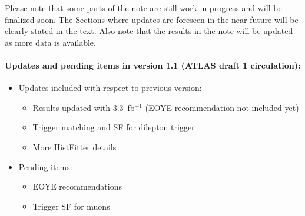 Please note that some parts of the note are still work in progress and will be finalized soon.
The Sections where updates are foreseen in the near future will be clearly stated in the text. 
Also note that the results in the note will be updated as more data is available.


\paragraph{Updates and pending items in version 1.1 (ATLAS draft 1 circulation):}
\begin{itemize}
\item Updates included with respect to previous version:
\begin{itemize}
\item Results updated with 3.3~fb$^{-1}$ (EOYE recommendation not included yet)
\item Trigger matching and SF for dilepton trigger
\item More HistFitter details
\end{itemize}

\item Pending items: 
\begin{itemize}
\item EOYE recommendations
\item Trigger SF for muons
\end{itemize}

\end{itemize}

